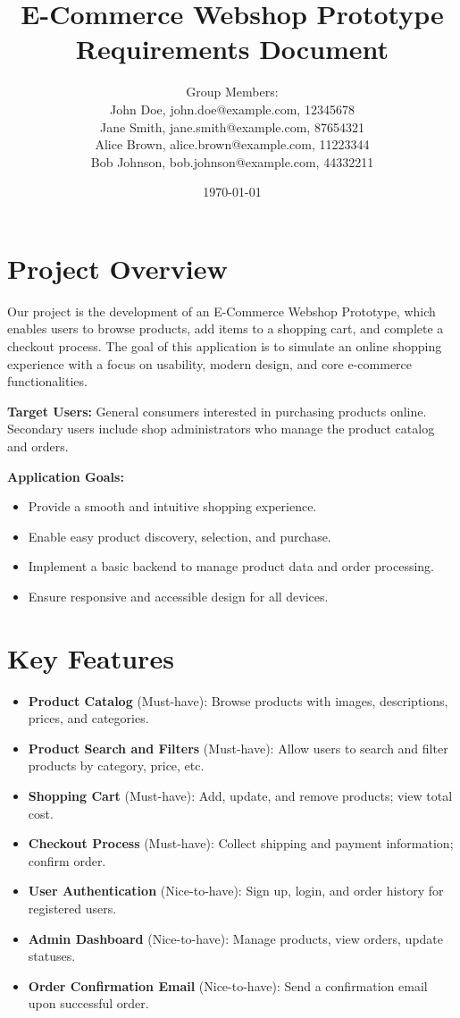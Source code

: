 \documentclass[a4paper,12pt]{article}
\title{E-Commerce Webshop Prototype \\
	Requirements Document}
\author{
	Group Members: \\
	John Doe, john.doe@example.com, 12345678 \\
	Jane Smith, jane.smith@example.com, 87654321 \\
	Alice Brown, alice.brown@example.com, 11223344 \\
	Bob Johnson, bob.johnson@example.com, 44332211
}
\date{\today}
\begin{document}
	
	\maketitle
	
	\section{Project Overview}
	Our project is the development of an E-Commerce Webshop Prototype, which enables users to browse products, add items to a shopping cart, and complete a checkout process. The goal of this application is to simulate an online shopping experience with a focus on usability, modern design, and core e-commerce functionalities.
	
	\textbf{Target Users:}  
	General consumers interested in purchasing products online. Secondary users include shop administrators who manage the product catalog and orders.
	
	\textbf{Application Goals:}
	\begin{itemize}
		\item Provide a smooth and intuitive shopping experience.
		\item Enable easy product discovery, selection, and purchase.
		\item Implement a basic backend to manage product data and order processing.
		\item Ensure responsive and accessible design for all devices.
	\end{itemize}
	
	\section{Key Features}
	\begin{itemize}
		\item \textbf{Product Catalog} (Must-have): Browse products with images, descriptions, prices, and categories.
		\item \textbf{Product Search and Filters} (Must-have): Allow users to search and filter products by category, price, etc.
		\item \textbf{Shopping Cart} (Must-have): Add, update, and remove products; view total cost.
		\item \textbf{Checkout Process} (Must-have): Collect shipping and payment information; confirm order.
		\item \textbf{User Authentication} (Nice-to-have): Sign up, login, and order history for registered users.
		\item \textbf{Admin Dashboard} (Nice-to-have): Manage products, view orders, update statuses.
		\item \textbf{Order Confirmation Email} (Nice-to-have): Send a confirmation email upon successful order.
	\end{itemize}
	
\end{document}
